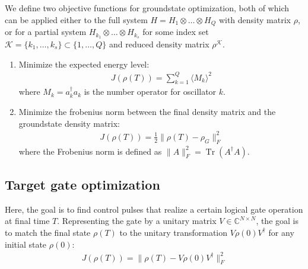 \documentclass[letterpaper]{article}
\DeclareMathOperator{\Tr}{Tr}
\newcommand{\C}{\mathds{C}}
\begin{document}
We define two objective functions for groundstate optimization, both of which can be applied either to the full system $H = H_1\otimes \dots \otimes H_Q$ with density matrix $\rho$, or for a partial system $H_{k_1}\otimes \dots \otimes H_{k_s}$ for some index set $\mathcal{K}=\{k_1,\dots,k_s\}\subset \{1,\dots,Q\}$ and reduced density matrix $\rho^{\mathcal{K}}$.
\begin{enumerate}
  \item Minimize the expected energy level:
    \begin{align}
      J(\rho(T)) = \sum_{k=1}^Q\langle M_k \rangle^2
    \end{align}
    where $M_k = a_k^\dag a_k$ is the number operator for oscillator $k$. 
  \item Minimize the frobenius norm between the final density matrix and the groundstate density matrix:
    \begin{align}
      J(\rho(T)) = \frac 12 \| \rho(T) - \rho_G \|^2_F 
    \end{align}
    where the Frobenius norm is defined as $\|A\|^2_F = \Tr(A^{\dagger}A)$.
\end{enumerate}

\subsection{Target gate optimization}

Here, the goal is to find control pulses that realize a certain logical gate operation at final time $T$. Representing the gate by a unitary matrix $V\in \C^{N\times N}$, the goal is to match the final state $\rho(T)$ to the unitary transformation $V\rho(0)V^{\dagger}$ for any initial state $\rho(0)$:
\begin{align}
  J(\rho(T)) = \| \rho(T) - V\rho(0)V^{\dagger} \|^2_F 
\end{align} 
\end{document}
